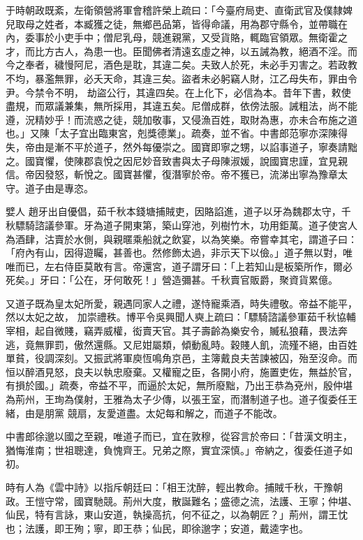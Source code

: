 \begin{pinyinscope}
 于時朝政既紊，左衛領營將軍會稽許榮上疏曰：「今臺府局吏、直衛武官及僕隸婢兒取母之姓者，本臧獲之徒，無鄉邑品第，皆得命議，用為郡守縣令，並帶職在內，委事於小吏手中；僧尼乳母，競進親黨，又受貨賂，輒臨官領眾。無衛霍之才，而比方古人，為患一也。臣聞佛者清遠玄虛之神，以五誡為教，絕酒不淫。而今之奉者，穢慢阿尼，酒色是耽，其違二矣。夫致人於死，未必手刃害之。若政教不均，暴濫無罪，必夭天命，其違三矣。盜者未必躬竊人財，江乙母失布，罪由令尹。今禁令不明，
 劫盜公行，其違四矣。在上化下，必信為本。昔年下書，敕使盡規，而眾議兼集，無所採用，其違五矣。尼僧成群，依傍法服。誡粗法，尚不能遵，況精妙乎！而流惑之徒，競加敬事，又侵漁百姓，取財為惠，亦未合布施之道也。」又陳「太子宜出臨東宮，剋獎德業」。疏奏，並不省。中書郎范寧亦深陳得失，帝由是漸不平於道子，然外每優崇之。國寶即寧之甥，以諂事道子，寧奏請黜之。國寶懼，使陳郡袁悅之因尼妙音致書與太子母陳淑媛，說國寶忠謹，宜見親信。帝因發怒，斬悅之。國寶甚懼，復潛寧於帝。帝不獲已，流涕出寧為豫章太守。道子由是專恣。



 嬖人
 趙牙出自優倡，茹千秋本錢塘捕賊吏，因賂諂進，道子以牙為魏郡太守，千秋驃騎諮議參軍。牙為道子開東第，築山穿池，列樹竹木，功用鉅萬。道子使宮人為酒肆，沽賣於水側，與親暱乘船就之飲宴，以為笑樂。帝嘗幸其宅，謂道子曰：「府內有山，因得遊矚，甚善也。然修飾太過，非示天下以儉。」道子無以對，唯唯而已，左右侍臣莫敢有言。帝還宮，道子謂牙曰：「上若知山是板築所作，爾必死矣。」牙曰：「公在，牙何敢死！」營造彌甚。千秋賣官販爵，聚資貨累億。



 又道子既為皇太妃所愛，親遇同家人之禮，遂恃寵乘酒，時失禮敬。帝益不能平，然以太妃之故，
 加崇禮秩。博平令吳興聞人奭上疏曰：「驃騎諮議參軍茹千秋協輔宰相，起自微賤，竊弄威權，衒賣天官。其子壽齡為樂安令，贓私狼藉，畏法奔逃，竟無罪罰，傲然還縣。又尼姏屬類，傾動亂時。穀賤人飢，流殣不絕，由百姓單貧，役調深刻。又振武將軍庾恆鳴角京邑，主簿戴良夫苦諫被囚，殆至沒命。而恒以醉酒見怒，良夫以執忠廢棄。又權寵之臣，各開小府，施置吏佐，無益於官，有損於國。」疏奏，帝益不平，而逼於太妃，無所廢黜，乃出王恭為兗州，殷仲堪為荊州，王珣為僕射，王雅為太子少傳，以張王室，而潛制道子也。道子復委任王緒，由是朋黨
 競扇，友愛道盡。太妃每和解之，而道子不能改。



 中書郎徐邈以國之至親，唯道子而已，宜在敦穆，從容言於帝曰：「昔漢文明主，猶悔淮南；世祖聰達，負愧齊王。兄弟之際，實宜深慎。」帝納之，復委任道子如初。



 時有人為《雲中詩》以指斥朝廷曰：「相王沈醉，輕出教命。捕賊千秋，干豫朝政。王愷守常，國寶馳競。荊州大度，散誕難名；盛德之流，法護、王寧；仲堪、仙民，特有言詠，東山安道，執操高抗，何不征之，以為朝匠？」荊州，謂王忱也；法護，即王殉；寧，即王恭；仙民，即徐邈字；安道，戴逵字也。




\end{pinyinscope}
